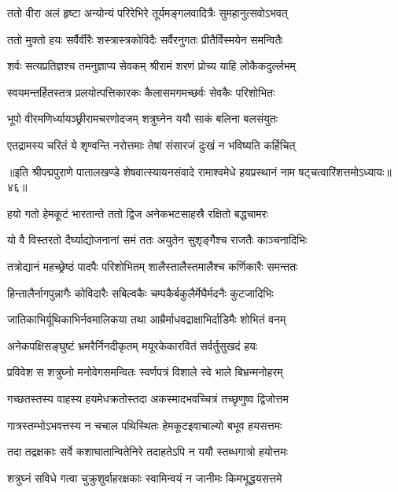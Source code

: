 \twolineshloka
{ततो वीरा अलं हृष्टा अन्योन्यं परिरेभिरे}
{तूर्यमङ्गलवादित्रैः सुमहानुत्सवोऽभवत्}%

\twolineshloka
{ततो मुक्तो हयः सर्वैर्वीरैः शस्त्रास्त्रकोविदैः}
{सर्वैरनुगतः प्रीतैर्विस्मयेन समन्वितैः}%

\twolineshloka
{शर्वः सत्यप्रतिज्ञश्च तमनुज्ञाप्य सेवकम्}
{श्रीरामं शरणं प्रोच्य याहि लोकैकदुर्ल्लभम्}%

\twolineshloka
{स्वयमन्तर्हितस्तत्र प्रलयोत्पत्तिकारकः}
{कैलासमगमच्छर्वः सेवकैः परिशोभितः}%

\twolineshloka
{भूपो वीरमणिर्ध्यायञ्छ्रीरामचरणोदजम्}
{शत्रुघ्नेन ययौ साकं बलिना बलसंयुतः}%

\twolineshloka
{एतद्रामस्य चरितं ये शृण्वन्ति नरोत्तमाः}
{तेषां संसारजं दुःखं न भविष्यति कर्हिचित्}%

{॥इति श्रीपद्मपुराणे पातालखण्डे शेषवात्स्यायनसंवादे रामाश्वमेधे हयप्रस्थानं नाम षट्चत्वारिंशत्तमोऽध्यायः॥४६॥}

\resetShloka


\twolineshloka
{हयो गतो हेमकूटं भारतान्ते ततो द्विज}
{अनेकभटसाहस्रै रक्षितो बद्धचामरः}%

\twolineshloka
{यो वै विस्तरतो दैर्घ्याद्योजनानां समं ततः}
{अयुतेन सुशृङ्गैश्च राजतैः काञ्चनादिभिः}%

\twolineshloka
{तत्रोद्यानं महच्छ्रेष्ठं पादपैः परिशोभितम्}
{शालैस्तालैस्तमालैश्च कर्णिकारैः समन्ततः}%

\twolineshloka
{हिन्तालैर्नागपुन्नागैः कोविदारैः सबिल्वकैः}
{चम्पकैर्बकुलैर्मेघैर्मदनैः कुटजादिभिः}%

\twolineshloka
{जातिकाभिर्यूथिकाभिर्नवमालिकया तथा}
{आम्रैर्माधवद्राक्षाभिर्दाडिमैः शोभितं वनम्}%

\twolineshloka
{अनेकपक्षिसङ्घुष्टं भ्रमरैर्निनदीकृतम्}
{मयूरकेकारवितं सर्वर्तुसुखदं हयः}%

\twolineshloka
{प्रविवेश स शत्रुघ्नो मनोवेगसमन्वितः}
{स्वर्णपत्रं विशाले स्वे भाले बिभ्रन्मनोहरम्}%

\twolineshloka
{गच्छतस्तस्य वाहस्य हयमेधक्रतोस्तदा}
{अकस्मादभवच्चित्रं तच्छृणुष्व द्विजोत्तम}%

\twolineshloka
{गात्रस्तम्भोऽभवत्तस्य न चचाल पथिस्थितः}
{हेमकूटइवाचाल्यो बभूव हयसत्तमः}%

\twolineshloka
{तदा तद्रक्षकाः सर्वे कशाघातान्वितेनिरे}
{तदाहतेऽपि न ययौ स्तब्धगात्रो हयोत्तमः}%

\twolineshloka
{शत्रुघ्नं सविधे गत्वा चुक्रुशुर्वाहरक्षकाः}
{स्वामिन्वयं न जानीमः किमभूद्धयसत्तमे}%

